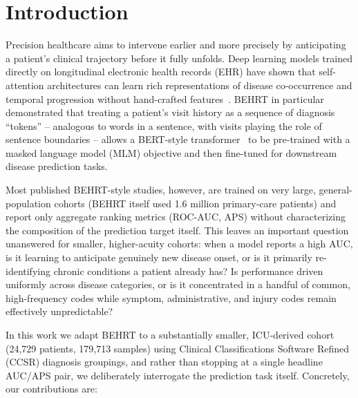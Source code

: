 \documentclass[11pt]{article}
\begin{document}
\section{Introduction}

Precision healthcare aims to intervene earlier and more precisely by
anticipating a patient's clinical trajectory before it fully unfolds. Deep
learning models trained directly on longitudinal electronic health records
(EHR) have shown that self-attention architectures can learn rich
representations of disease co-occurrence and temporal progression without
hand-crafted features~\cite{li2020behrt,vaswani2017attention}. BEHRT
in particular demonstrated that treating a patient's visit history as a
sequence of diagnosis ``tokens'' -- analogous to words in a sentence, with
visits playing the role of sentence boundaries -- allows a BERT-style
transformer~\cite{devlin2019bert} to be pre-trained with a masked language
model (MLM) objective and then fine-tuned for downstream disease prediction
tasks.

Most published BEHRT-style studies, however, are trained on very large,
general-population cohorts (BEHRT itself used 1.6 million primary-care
patients) and report only aggregate ranking metrics (ROC-AUC, APS) without
characterizing the composition of the prediction target itself. This leaves
an important question unanswered for smaller, higher-acuity cohorts: when a
model reports a high AUC, is it learning to anticipate genuinely new disease
onset, or is it primarily re-identifying chronic conditions a patient already
has? Is performance driven uniformly across disease categories, or is it
concentrated in a handful of common, high-frequency codes while symptom,
administrative, and injury codes remain effectively unpredictable?

In this work we adapt BEHRT to a substantially smaller, ICU-derived cohort
(24{,}729 patients, 179{,}713 samples) using Clinical Classifications Software
Refined (CCSR) diagnosis groupings, and rather than stopping at a single
headline AUC/APS pair, we deliberately interrogate the prediction task itself.
Concretely, our contributions are:
\end{document}
